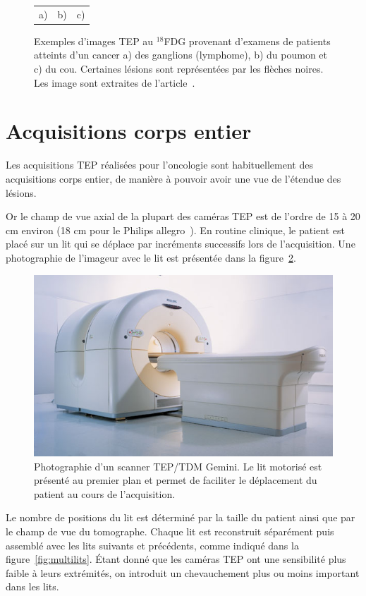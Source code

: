 \begin{figure}[h!]
\begin{tabular}{c c c}
a) & b) & c)
\end{tabular}
\caption[Exemples d'images TEP]{Exemples d’images TEP au $^{18}$FDG provenant d’examens de patients atteints d’un cancer a) des ganglions (lymphome), b) du poumon et c) du cou. Certaines lésions sont représentées par les flèches noires. Les image sont extraites de l'article~\cite{rohren2004clinical}.}
\label{fig:exTEP}
\end{figure}

\section{Acquisitions corps entier}


Les acquisitions TEP réalisées pour l'oncologie sont habituellement des acquisitions corps entier, de manière à pouvoir avoir une vue de l'étendue des lésions.

Or le champ de vue axial de la plupart des caméras TEP est de l'ordre de 15 à 20 cm environ (18 cm pour le Philips allegro~\cite{lamare2006validation}). En routine clinique, le patient est placé sur un lit qui se déplace par incréments successifs lors de l'acquisition. Une photographie de l'imageur avec le lit est présentée dans la figure~\ref{fig:photoGemini}.

\begin{figure}
\centering
\includegraphics[width=12cm]{images/gemini}
\caption[Photographie d'un scanner TEP gemini]{Photographie d'un scanner TEP/TDM Gemini. Le lit motorisé est présenté au premier plan et permet de faciliter le déplacement du patient au cours de l'acquisition.}
\label{fig:photoGemini}
\end{figure}

Le nombre de positions du lit est déterminé par la taille du patient ainsi que par le champ de vue du tomographe. Chaque lit est reconstruit séparément puis assemblé avec les lits suivants et précédents, comme indiqué dans la figure~\ref{fig:multilits}. \'Etant donné que les caméras TEP ont une sensibilité plus faible à leurs extrémités, on introduit un chevauchement plus ou moins important dans les lits.

